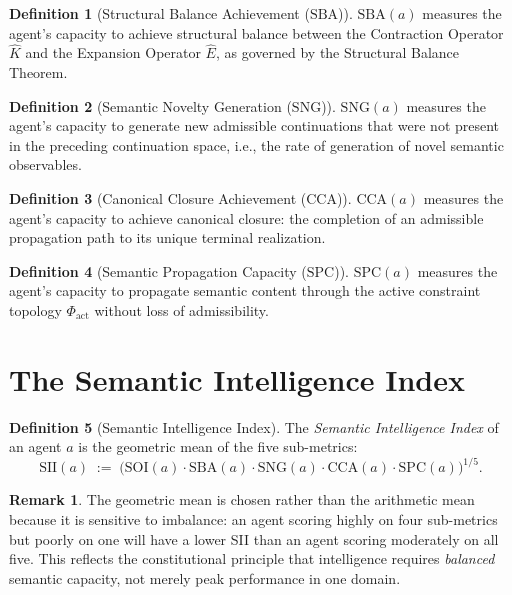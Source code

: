 \documentclass[12pt,anyside]{book}
\theoremstyle{plain}
\theoremstyle{definition}
\newtheorem{definition}{Definition}[chapter]
\newtheorem{remark}{Remark}[chapter]
\newcommand{\Ehat}{\hat{E}}            %
\newcommand{\SII}{\mathrm{SII}}        %
\newcommand{\SOI}{\mathrm{SOI}}        %
\newcommand{\SBA}{\mathrm{SBA}}        %
\newcommand{\SNG}{\mathrm{SNG}}        %
\newcommand{\CCA}{\mathrm{CCA}}        %
\newcommand{\SPC}{\mathrm{SPC}}        %
\begin{document}
\begin{definition}[Structural Balance Achievement ($\SBA$)]\label{def:sba}
$\SBA(a)$ measures the agent's capacity to achieve structural balance between the Contraction Operator $\hat{K}$ and the Expansion Operator $\Ehat$, as governed by the Structural Balance Theorem.
\end{definition}

\begin{definition}[Semantic Novelty Generation ($\SNG$)]\label{def:sng}
$\SNG(a)$ measures the agent's capacity to generate new admissible continuations that were not present in the preceding continuation space, i.e., the rate of generation of novel semantic observables.
\end{definition}

\begin{definition}[Canonical Closure Achievement ($\CCA$)]\label{def:cca}
$\CCA(a)$ measures the agent's capacity to achieve canonical closure: the completion of an admissible propagation path to its unique terminal realization.
\end{definition}

\begin{definition}[Semantic Propagation Capacity ($\SPC$)]\label{def:spc}
$\SPC(a)$ measures the agent's capacity to propagate semantic content through the active constraint topology $\Phi_{\mathrm{act}}$ without loss of admissibility.
\end{definition}

\section{The Semantic Intelligence Index}

\begin{definition}[Semantic Intelligence Index]\label{def:sii}
The \emph{Semantic Intelligence Index} of an agent $a$ is the geometric mean of the five sub-metrics:
\[
\boxed{
\SII(a) \;:=\;
\bigl(\SOI(a) \cdot \SBA(a) \cdot \SNG(a) \cdot \CCA(a) \cdot \SPC(a)\bigr)^{1/5}.
}
\]
\end{definition}

\begin{remark}
The geometric mean is chosen rather than the arithmetic mean because it is sensitive to imbalance: an agent scoring highly on four sub-metrics but poorly on one will have a lower SII than an agent scoring moderately on all five. This reflects the constitutional principle that intelligence requires \emph{balanced} semantic capacity, not merely peak performance in one domain.
\end{remark}
\end{document}
